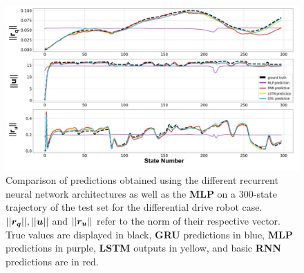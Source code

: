 \begin{figure}[t]
    \centering
    \includegraphics[width=0.99\linewidth]{figures/learning_unic/all_models_labeled.jpg} 
    \caption{Comparison of predictions obtained using the different recurrent neural network architectures as well as the \textbf{MLP} on a 300-state trajectory of the test set for the differential drive robot case. 
    $||\boldsymbol{r_q}||, ||\boldsymbol{u}||$ and $||\boldsymbol{r_u}||$ refer to the norm of their respective vector. 
    True values are displayed in black, \textbf{GRU} predictions in blue, \textbf{MLP} predictions in purple, \textbf{LSTM} outputs in yellow, and basic \textbf{RNN} predictions are in red.}
    \label{fig:all_models_pred_val_unic}
\end{figure}

